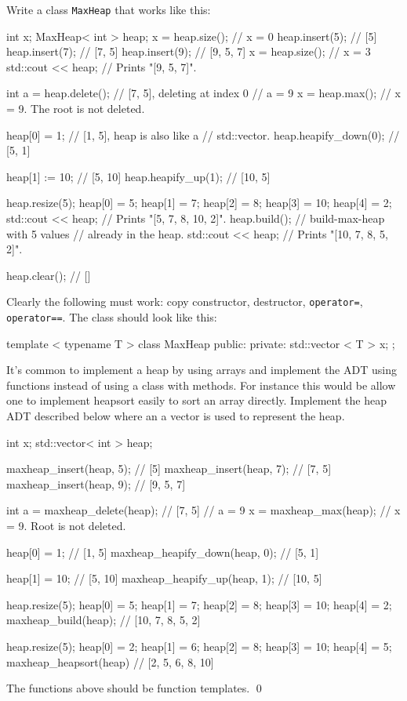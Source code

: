 \begin{ex}
Write a class \texttt{MaxHeap} that works like this:
\begin{console}
int x;
MaxHeap< int > heap;
x = heap.size();       // x = 0 
heap.insert(5);        // [5]
heap.insert(7);        // [7, 5]
heap.insert(9);        // [9, 5, 7]
x = heap.size();       // x = 3
std::cout << heap;     // Prints "[9, 5, 7]".

int a = heap.delete(); // [7, 5], deleting at index 0
                       // a = 9
x = heap.max();        // x = 9. The root is not deleted.

heap[0] = 1;           // [1, 5], heap is also like a
                       // std::vector.
heap.heapify_down(0);  // [5, 1]

heap[1] := 10;         // [5, 10]
heap.heapify_up(1);    // [10, 5]

heap.resize(5);
heap[0] = 5;
heap[1] = 7;
heap[2] = 8;
heap[3] = 10;
heap[4] = 2;
std::cout << heap;     // Prints "[5, 7, 8, 10, 2]".
heap.build();          // build-max-heap with 5 values
                       // already in the heap.
std::cout << heap;     // Prints "[10, 7, 8, 5, 2]".

heap.clear();          // []
\end{console}
\end{ex}
Clearly the following must work: copy constructor, destructor,
\verb!operator=!, \verb!operator==!.
The class should look like this:
\begin{console}
template < typename T >
class MaxHeap
{
public:
private:
    std::vector < T > x;
};
\end{console}



\newpage
\begin{ex}
  It's common to implement a heap by using arrays and implement the
  ADT using functions instead of using a class with methods.
  For instance this would be allow one to implement heapsort easily
  to sort an array directly.
  Implement the heap ADT described below where an a vector is used
  to represent the heap.
\begin{console}
int x;
std::vector< int > heap;

maxheap_insert(heap, 5);   // [5]
maxheap_insert(heap, 7);   // [7, 5]
maxheap_insert(heap, 9);   // [9, 5, 7]

int a = maxheap_delete(heap); // [7, 5]
                           // a = 9
x = maxheap_max(heap);     // x = 9. Root is not deleted.

heap[0] = 1;               // [1, 5]
maxheap_heapify_down(heap, 0); // [5, 1]

heap[1] = 10;              // [5, 10]
maxheap_heapify_up(heap, 1); // [10, 5]

heap.resize(5);
heap[0] = 5;
heap[1] = 7;
heap[2] = 8;
heap[3] = 10;
heap[4] = 2;
maxheap_build(heap);       // [10, 7, 8, 5, 2]

heap.resize(5);
heap[0] = 2;
heap[1] = 6;
heap[2] = 8;
heap[3] = 10;
heap[4] = 5;
maxheap_heapsort(heap)     // [2, 5, 6, 8, 10]
\end{console}
The functions above should be function templates.
\qed
\end{ex}


